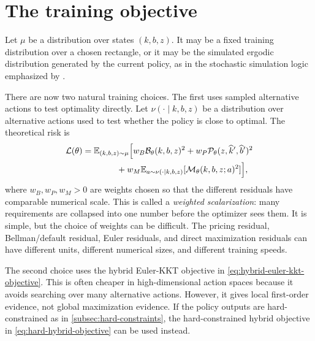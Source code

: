 \documentclass[11pt]{article}
\newcommand{\E}{\mathbb{E}}
\newcommand{\1}{\mathbf{1}}
\begin{document}
\section{The training objective}

Let \(\mu\) be a distribution over states \((k,b,z)\). It may be a fixed training
distribution over a chosen rectangle, or it may be the simulated ergodic
distribution generated by the current policy, as in the stochastic simulation
logic emphasized by \citet[Section 3]{maliar2021deep}.

There are now two natural training choices. The first uses sampled alternative
actions to test optimality directly. Let \(\nu(\cdot\mid k,b,z)\) be a
distribution over alternative actions used to test whether the policy is close
to optimal. The theoretical risk is
\begin{align}
  \mathcal L(\theta)
  &=
  \E_{(k,b,z)\sim\mu}
  \Big[
    w_B \mathcal B_\theta(k,b,z)^2
    +w_P \mathcal P_\theta(z,\widehat k',\widehat b')^2
  \notag\\
  &\qquad\qquad
    +w_M
    \E_{a\sim\nu(\cdot\mid k,b,z)}
    [\mathcal M_\theta(k,b,z;a)^2]
  \Big],
  \label{eq:training-objective}
\end{align}
where \(w_B,w_P,w_M>0\) are weights chosen so that the different residuals have
comparable numerical scale. This is called a \emph{weighted scalarization}: many
requirements are collapsed into one number before the optimizer sees them. It is
simple, but the choice of weights can be difficult. The pricing residual,
Bellman/default residual, Euler residuals, and direct maximization residuals can
have different units, different numerical sizes, and different training speeds.

The second choice uses the hybrid Euler-KKT objective in
\cref{eq:hybrid-euler-kkt-objective}. This is often cheaper in high-dimensional
action spaces because it avoids searching over many alternative actions.
However, it gives local first-order evidence, not global maximization evidence.
If the policy outputs are hard-constrained as in
\cref{subsec:hard-constraints}, the hard-constrained hybrid objective in
\cref{eq:hard-hybrid-objective} can be used instead.
\end{document}
